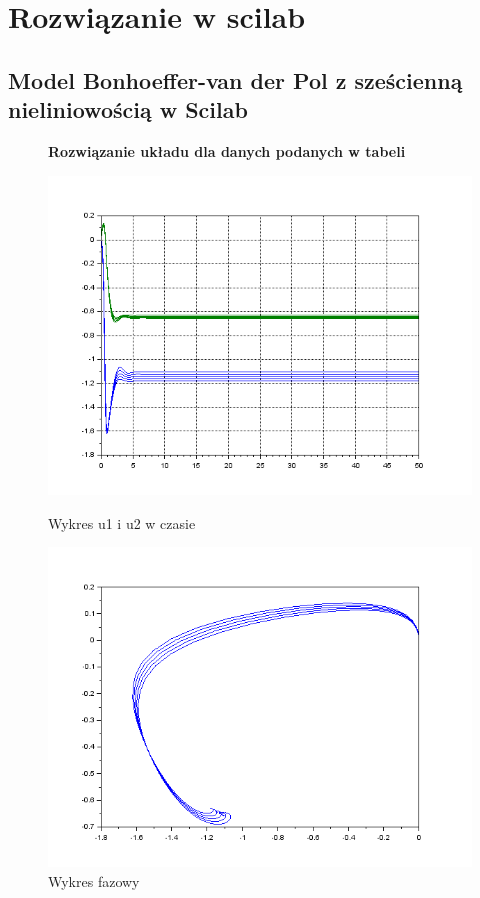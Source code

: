 \documentclass[12pt]{article}
\begin{document}
\section{Rozwiązanie w scilab}

\subsection{Model Bonhoeffer-van der Pol z sześcienną nieliniowością w Scilab}

\begin{figure}[H]
\textbf{Rozwiązanie układu dla danych podanych w tabeli}
  \centering
  \begin{minipage}[b]{0.49\textwidth}
    \includegraphics[scale=0.4]{./img/3-1-xy}
    \caption{Wykres u1 i u2 w czasie}
    \end{minipage}
  \hfill
  \begin{minipage}[b]{0.49\textwidth}
    \includegraphics[scale=0.4]{./img/3-1-phase}
    \caption{Wykres fazowy}
    \label{4-analityczne}
  \end{minipage}
\end{figure}
\end{document}
